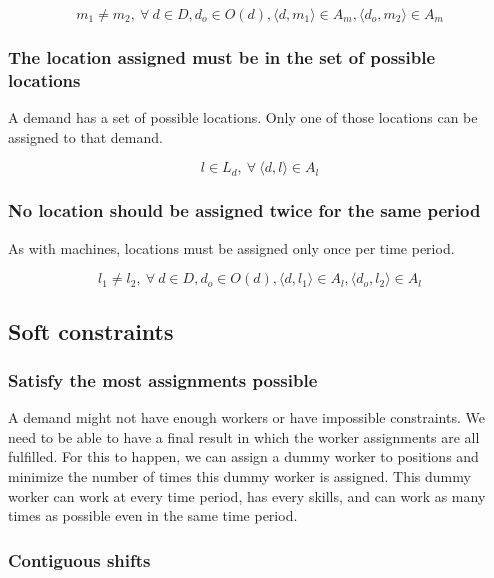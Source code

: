 \documentclass[../thesis.tex]{subfiles}
\begin{document}
\begin{equation*}
  m_1 \neq m_2, \ \forall \ d \in D, d_o \in O(d), \langle d, m_1\rangle \in A_m, \langle d_o, m_2\rangle \in A_m
\end{equation*}


\subsubsection{The location assigned must be in the set of possible locations}

A demand has a set of possible locations. Only one of those locations can be assigned 
to that demand.

\begin{equation*}
  l \in L_d, \ \forall \ \langle d, l\rangle \in A_l
\end{equation*}

\subsubsection{No location should be assigned twice for the same period}

As with machines, locations must be assigned only once per time period.

\begin{equation*}
  l_1 \neq l_2, \ \forall \ d \in D, d_o \in O(d), \langle d, l_1\rangle \in A_l, \langle d_o, l_2\rangle \in A_l
\end{equation*}

\subsection{Soft constraints}

\subsubsection{Satisfy the most assignments possible}

A demand might not have enough workers or have impossible constraints. We need to be able to have 
a final result in which the worker assignments are all fulfilled.
For this to happen, we can assign a dummy worker to positions and minimize the number of times this dummy worker is 
assigned. This dummy worker can work at every time period, has every skills, 
and can work as many times as possible even in the same time period.


\subsubsection{Contiguous shifts}
\end{document}

